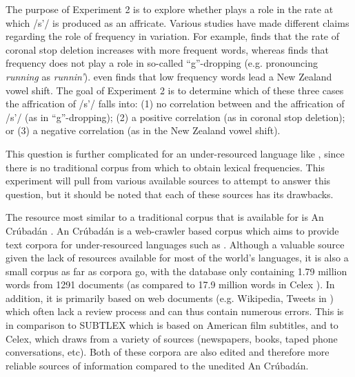 \documentclass[output=paper,newtxmath,modfonts,nonflat,final]{langsci/langscibook}
\begin{document}
The purpose of Experiment 2 is to explore whether  plays a role in the rate at which /s’/ is produced as an affricate. Various studies have made different claims regarding the role of frequency in variation. For example, \citet{bybee2002word} finds that the rate of  coronal stop deletion increases with more frequent words, whereas \citet{labov2011principles} finds that frequency does not play a role in so-called “g”-dropping (e.g. pronouncing \textit{running} as \textit{runnin’}). \citet{hay2015tracking} even finds that low frequency words lead a New Zealand vowel shift. The goal of Experiment 2 is to determine which of these three cases the affrication of /s’/ falls into: (1) no correlation between  and the affrication of /s’/ (as in “g”-dropping); (2) a positive correlation (as in coronal stop deletion); or (3) a negative correlation (as in the New Zealand vowel shift).

This question is further complicated for an under-resourced language like , since there is no traditional corpus from which to obtain lexical frequencies. This experiment will pull from various available sources to attempt to answer this question, but it should be noted that each of these sources has its drawbacks. 

The resource most similar to a traditional corpus that is available for  is An Crúbadán \citep{scannell2007crubadan}. An Crúbadán is a web-crawler based corpus which aims to provide text corpora for under-resourced languages such as . Although a valuable source given the lack of resources available for most of the world’s languages, it is also a small corpus as far as corpora go, with the  database only containing 1.79 million words from 1291 documents (as compared to 17.9 million words in Celex \citep{BaayenEtAl1993}). In addition, it is primarily based on web documents (e.g.  Wikipedia, Tweets in ) which often lack a review process and can thus contain numerous errors. This is in comparison to SUBTLEX which is based on American film subtitles, and to Celex, which draws from a variety of sources (newspapers, books, taped phone conversations, etc). Both of these corpora are also edited and therefore more reliable sources of information compared to the unedited An Crúbadán.
\end{document}
